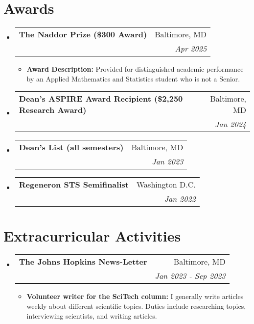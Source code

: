 \documentclass[letterpaper,11pt]{article}
\makeatletter
\newcommand{\resumeItemSpace}[2]{
  \item\small{
    \textbf{#1}{ #2 \vspace{-2pt}}
  }
}
\newcommand{\resumeSubheading}[4]{
  \vspace{-1pt}\item
    \begin{tabular*}{0.98\textwidth}[t]{l@{\extracolsep{\fill}}r}
      \textbf{#1} & #2 \\
      \makecell[l]{\textit{\small#3}} & \textit{\small #4} \\
    \end{tabular*}\vspace{-5pt}
}
\newcommand{\resumeSubHeadingListStart}{\begin{itemize}[leftmargin=*,rightmargin=\dimexpr\linewidth-0.9\textwidth-\leftmargin\relax]}
\newcommand{\resumeSubHeadingListEnd}{\end{itemize}}
\newcommand{\resumeItemListStart}{\begin{itemize}[rightmargin=\dimexpr\linewidth-0.75\textwidth-\leftmargin\relax]}
\newcommand{\resumeItemListEnd}{\end{itemize}\vspace{-5pt}}
\makeatother
\begin{document}
\section{Awards}
  \resumeSubHeadingListStart

    \resumeSubheading{The Naddor Prize (\$300 Award)}{Baltimore, MD}{The Johns Hopkins University}{Apr 2025}
    \resumeItemListStart
    \resumeItemSpace{Award Description:}
          {Provided for distinguished academic performance by an Applied Mathematics and Statistics student who is not a Senior.}
    \resumeItemListEnd

    \resumeSubheading{Dean's ASPIRE Award Recipient (\$2,250 Research Award)}{Baltimore, MD}{The Johns Hopkins University}{Jan 2024}

    \resumeSubheading{Dean's List (all semesters)}{Baltimore, MD}{The Johns Hopkins University}{Jan 2023}

    \resumeSubheading{Regeneron STS Semifinalist}{Washington D.C.}{Society For Science}{Jan 2022}

  \resumeSubHeadingListEnd

\section*{Extracurricular Activities}
  \resumeSubHeadingListStart

  \resumeSubheading
    {The Johns Hopkins News-Letter}{Baltimore, MD}
    {Writer}{Jan 2023 - Sep 2023}
    \resumeItemListStart
      \resumeItemSpace{Volunteer writer for the SciTech column:}
        {I generally write articles weekly about different scientific topics. Duties include researching topics, interviewing scientists, and writing articles.}
    \resumeItemListEnd

  \resumeSubHeadingListEnd


\end{document}
